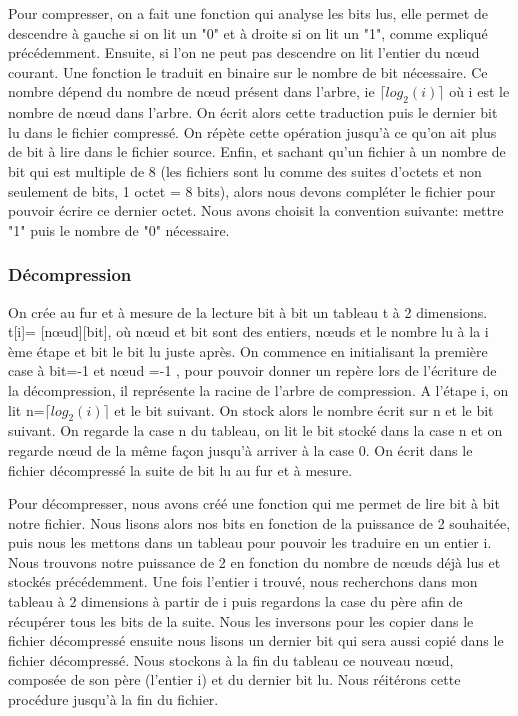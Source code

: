 \documentclass{report}
\begin{document}
Pour compresser, on a fait une fonction qui analyse les bits lus, elle permet de descendre à gauche si on lit un "0" et à droite si on lit un "1", comme expliqué précédemment. Ensuite, si l'on ne peut pas descendre on lit l'entier du nœud courant. Une fonction le traduit en binaire sur le nombre de bit nécessaire. Ce nombre dépend du nombre de nœud présent dans l'arbre, ie $\lceil log_{2}(i) \rceil$ où i est le nombre de nœud dans l'arbre. 
On écrit alors cette traduction puis le dernier bit lu dans le fichier compressé. On répète cette opération jusqu'à ce qu'on ait plus de bit  à lire dans le fichier source.
Enfin, et sachant qu'un fichier à un nombre de bit qui est multiple de 8 (les fichiers sont lu comme des suites d'octets et non seulement de bits, 1 octet = 8 bits), alors nous devons compléter le fichier pour pouvoir écrire ce dernier octet.
Nous avons choisit la convention suivante: mettre "1" puis le nombre de "0" nécessaire. 

\subsubsection{Décompression}
On crée au fur et à mesure de la lecture bit à bit un tableau t à 2 dimensions.  t[i]= [nœud][bit], où nœud et bit sont des entiers, nœuds et le nombre lu à la i ème étape et bit le bit lu juste après. 
On commence en initialisant la première case à  bit=-1 et nœud =-1 , pour pouvoir donner un repère lors de l'écriture de la décompression, il représente la racine de l'arbre de compression.  
A l'étape i, on lit n=$\lceil log_{2}(i) \rceil$ et le bit suivant. On stock alors le nombre écrit sur n et le bit suivant. On regarde la case n du tableau, on lit le bit stocké dans la case n et on regarde nœud de la même façon jusqu'à arriver à la case 0. On écrit dans le fichier décompressé la suite de bit lu au fur et à mesure.

Pour décompresser, nous avons créé une fonction qui me permet de lire bit à bit notre fichier. Nous lisons alors nos bits en fonction de la puissance de 2 souhaitée, puis nous les mettons dans un tableau pour pouvoir les traduire en un entier i. 
Nous trouvons notre puissance de 2 en fonction du nombre de nœuds déjà lus et stockés précédemment.
Une fois l'entier i  trouvé, nous recherchons dans mon tableau à 2 dimensions à partir de i puis regardons la case du père afin de récupérer tous les bits de la suite. Nous les inversons pour les copier dans le fichier décompressé ensuite nous lisons un dernier bit qui sera aussi copié dans le fichier décompressé.
Nous stockons à la fin du tableau ce nouveau nœud, composée de son père (l'entier i) et du dernier bit lu. 
Nous réitérons cette procédure jusqu'à la fin du fichier. 
\end{document}

